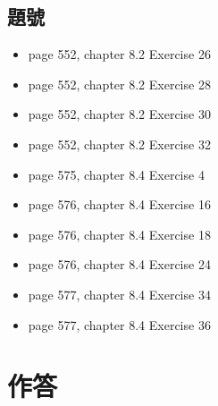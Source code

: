\documentclass[sigconf]{acmart}
\begin{document}
\subsection{題號}
\begin{shaded}
\begin{itemize}
    \item[-] page 552, chapter 8.2 Exercise 26
    \item[-] page 552, chapter 8.2 Exercise 28
    \item[-] page 552, chapter 8.2 Exercise 30
    \item[-] page 552, chapter 8.2 Exercise 32
    \item[-] page 575, chapter 8.4 Exercise 4
    \item[-] page 576, chapter 8.4 Exercise 16
    \item[-] page 576, chapter 8.4 Exercise 18
    \item[-] page 576, chapter 8.4 Exercise 24
    \item[-] page 577, chapter 8.4 Exercise 34
    \item[-] page 577, chapter 8.4 Exercise 36
\end{itemize}
\end{shaded}

\section{作答}
\end{document}
